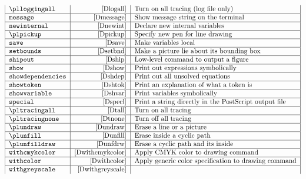 \begin{table}[htp]
$$\begin{tabular}{|l|r|l|}
\pl\tt \verb|loggingall|&       \pageref{Dlogall}&
        Turn on all tracing (log file only)\\\hline
\tt \verb|message|& \pageref{Dmessage}&
        Show message string on the terminal\\\hline
\tt \verb|newinternal|& \pageref{Dnewint}&
        Declare new internal variables\\\hline
\pl\tt \verb|pickup|&   \pageref{Dpickup}&
        Specify new pen for line drawing\\\hline
\tt \verb|save|&        \pageref{Dsave}&
        Make variables local\\\hline
\tt \verb|setbounds|&   \pageref{Dsetbnd}&
        Make a picture lie about its bounding box\\\hline
\tt \verb|shipout|&     \pageref{Dship}&
        Low-level command to output a figure\\\hline
\tt \verb|show|&        \pageref{Dshow}&
        Print out expressions symbolically\\\hline
\tt \verb|showdependencies|&    \pageref{Dshdep}&
        Print out all unsolved equations\\\hline
\tt \verb|showtoken|&   \pageref{Dshtok}&
        Print an explanation of what a token is\\\hline
\tt \verb|showvariable|&        \pageref{Dshvar}&
        Print variables symbolically\\\hline
\tt \verb|special|&     \pageref{Dspecl}&
        Print a string directly in the PostScript output file\\\hline
\pl\tt \verb|tracingall|&       \pageref{Dtall}&
        Turn on all tracing\\\hline
\pl\tt \verb|tracingnone|&      \pageref{Dtnone}&
        Turn off all tracing\\\hline
\pl\tt \verb|undraw|&   \pageref{Dundraw}&
        Erase a line or a picture\\\hline
\pl\tt \verb|unfill|&   \pageref{Dunfill}&
        Erase inside a cyclic path\\\hline
\pl\tt \verb|unfilldraw|&       \pageref{Dunfdrw}&
        Erase a cyclic path and its inside\\\hline
\tt \verb|withcmykcolor|&    \pageref{Dwithcmykcolor}&
        Apply CMYK color to drawing command\\\hline
\tt \verb|withcolor|&        \pageref{Dwithcolor}&
        Apply generic color specification to drawing command\\\hline
\tt \verb|withgreyscale|&    \pageref{Dwithgreyscale}&

\end{tabular}$$
\end{table}
